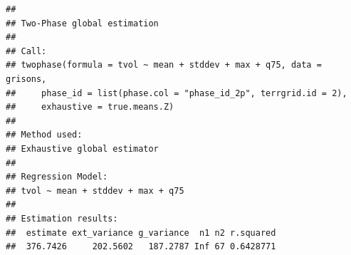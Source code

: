 \documentclass[
]{article}
\begin{document}
\begin{verbatim}
## 
## Two-Phase global estimation
##  
## Call: 
## twophase(formula = tvol ~ mean + stddev + max + q75, data = grisons, 
##     phase_id = list(phase.col = "phase_id_2p", terrgrid.id = 2), 
##     exhaustive = true.means.Z)
## 
## Method used:
## Exhaustive global estimator
##  
## Regression Model:
## tvol ~ mean + stddev + max + q75
## 
## Estimation results:
##  estimate ext_variance g_variance  n1 n2 r.squared
##  376.7426     202.5602   187.2787 Inf 67 0.6428771
\end{verbatim}
\end{document}
